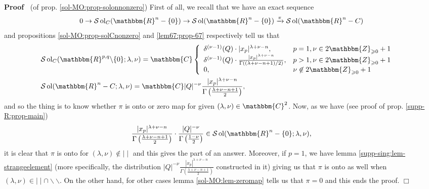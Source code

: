 \documentclass{article}
\newcommand{\nin}{\not\in}
\newcommand{\tmop}[1]{\ensuremath{\operatorname{#1}}}
\renewenvironment{proof}{\noindent\textbf{Proof\ }}{\hspace*{\fill}$\Box$\medskip}
\theoremstyle{remark}
\begin{document}
\begin{proof}
  (of prop. \ref{sol-MO:prop-solonnonzero}) First of all, we recall that we
  have an exact sequence
  \[ 0 \rightarrow \mathcal{S} \tmop{ol}_C (\mathbbm{R}^n - \{ 0 \})
     \rightarrow \mathcal{S} \tmop{ol} (\mathbbm{R}^n - \{ 0 \})
     \xrightarrow{\pi} \mathcal{S} \tmop{ol} (\mathbbm{R}^n - C) \]
  and propositions \ref{sol-MO:prop-solCnonzero} and \ref{lem67:prop-67}
  respectively tell us that
  \begin{eqnarray}
    & \mathcal{S} \tmop{ol}_C (\mathbbm{R}^{p, q} \backslash \{ 0 \} ;
    \lambda, \nu) =\mathbbm{C} \left\{ \begin{array}{ll}
      \delta^{(\nu - 1)} (Q) \cdot | x_p |^{\lambda + \nu - n}, & p = 1, \nu
      \in 2\mathbbm{Z}_{\geqslant 0} + 1\\
      \delta^{(\nu - 1)} (Q) \cdot \frac{| x_p |^{\lambda + \nu - n}}{\Gamma
      ((\lambda + \nu - n + 1) / 2)}, & p > 1, \nu \in 2\mathbbm{Z}_{\geqslant
      0} + 1\\
      0, & \nu \nin 2\mathbbm{Z}_{\geqslant 0} + 1
    \end{array} \right. &  \nonumber\\
    & \mathcal{S} \tmop{ol} (\mathbbm{R}^n - C ; \lambda, \nu) =\mathbbm{C} |
    Q |^{- \nu} \frac{| x_p |^{\lambda + \nu - n}}{\Gamma \left( \frac{\lambda
    + \nu - n + 1}{2} \right)}, &  \nonumber
  \end{eqnarray}
  and so the thing is to know whether $\pi$ is onto or zero map for given
  $(\lambda, \nu) \in \mathbbm{C}^2$. Now, as we have (see proof of prop.
  \ref{supp-R:prop-main})
  \[ \frac{| x_p |^{\lambda + \nu - n}}{\Gamma \left( \frac{\lambda + \nu - n
     + 1}{2} \right)} \cdot \frac{| Q |^{- \nu}}{\Gamma \left( \frac{1 -
     \nu}{2} \right)} \in \mathcal{S} \tmop{ol} (\mathbbm{R}^n - \{ 0 \} ;
     \lambda, \nu), \]
  it is clear that $\pi$ is onto for $(\lambda, \nu) \nin \mid \mid$ and this
  gives the part of an answer. Moreover, if $p = 1$, we have lemma
  \ref{supp-sing:lem-strangeelement} (more specifically, the distribution $| Q
  |^{- \nu} \frac{| x_p |^{\lambda + \nu - n}}{\Gamma \left( \frac{\lambda +
  \nu - n + 1}{2} \right)}$ constructed in it) giving us that $\pi$ is onto as
  well when $(\lambda, \nu) \in \mid \mid \cap \backslash\backslash$. On the
  other hand, for other cases lemma \ref{sol-MO:lem-zeromap} tells us that
  $\pi = 0$ and this ends the proof.
\end{proof}
\end{document}
